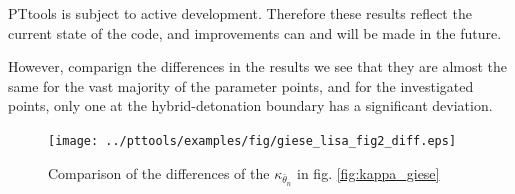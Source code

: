 PTtools is subject to active development.
Therefore these results reflect the current state of the code,
and improvements can and will be made in the future.

However, comparign the differences in the results we see that they are almost the same for the vast majority of the parameter points, and for the investigated points, only one at the hybrid-detonation boundary has a significant deviation.

\begin{figure}[ht!]
\centering
\texttt{[image: ../pttools/examples/fig/giese\_lisa\_fig2\_diff.eps]}
\caption{Comparison of the differences of the $\kappa_{\bar{\theta}_n}$ in fig. \ref{fig:kappa_giese}}
\label{fig:kappa_giese_diff}
\end{figure}
\fi
